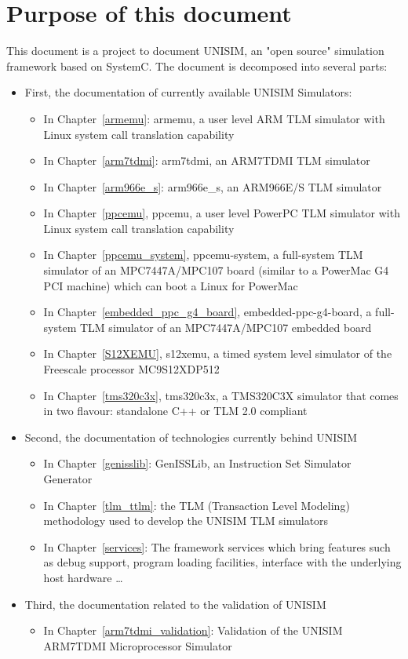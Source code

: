 \section{Purpose of this document}

This document is a project to document UNISIM, an "open source" simulation framework based on SystemC.
The document is decomposed into several parts:
\begin{itemize}
	\item First, the documentation of currently available UNISIM Simulators:
	\begin{itemize}
		\item In Chapter~\ref{armemu}: armemu, a user level ARM TLM simulator with Linux system call translation capability
		\item In Chapter~\ref{arm7tdmi}: arm7tdmi, an ARM7TDMI TLM simulator
		\item In Chapter~\ref{arm966e_s}: arm966e\_s, an ARM966E/S TLM simulator
		\item In Chapter~\ref{ppcemu}, ppcemu, a user level PowerPC TLM simulator with Linux system call translation capability
		\item In Chapter~\ref{ppcemu_system}, ppcemu-system, a full-system TLM simulator of an MPC7447A/MPC107 board (similar to a PowerMac G4 PCI machine) which can boot a Linux for PowerMac
		\item In Chapter~\ref{embedded_ppc_g4_board}, embedded-ppc-g4-board, a full-system TLM simulator of an MPC7447A/MPC107 embedded board
		\item In Chapter~\ref{S12XEMU}, s12xemu, a timed system level simulator of the Freescale processor MC9S12XDP512

		\item In Chapter~\ref{tms320c3x}, tms320c3x, a TMS320C3X simulator that comes in two flavour: standalone C++ or TLM 2.0 compliant
	\end{itemize}
	\item Second, the documentation of technologies currently behind UNISIM
	\begin{itemize}
		\item In Chapter~\ref{genisslib}: GenISSLib, an Instruction Set Simulator Generator
		\item In Chapter~\ref{tlm_ttlm}: the TLM (Transaction Level Modeling) methodology used to develop the UNISIM TLM simulators
		\item In Chapter~\ref{services}: The framework services which bring features such as debug support, program loading facilities, interface with the underlying host hardware \ldots
	\end{itemize}
	\item Third, the documentation related to the validation of UNISIM
	\begin{itemize}
		\item In Chapter~\ref{arm7tdmi_validation}: Validation of the UNISIM ARM7TDMI Microprocessor Simulator
	\end{itemize}
\end{itemize}

